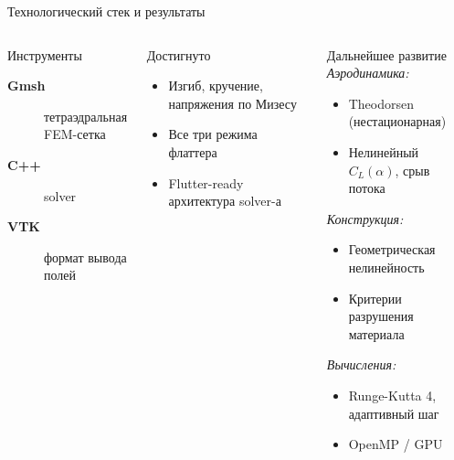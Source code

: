 \documentclass[9pt,aspectratio=169]{beamer}
\begin{document}
\begin{frame}{Технологический стек и результаты}
  \begin{columns}[T]
      \begin{block}{Инструменты}
        \begin{description}
          \item[\textbf{Gmsh}]     тетраэдральная FEM-сетка
          \item[\textbf{C++}]      solver
          \item[\textbf{VTK}]      формат вывода полей
        \end{description}
      \end{block}

      \medskip

      \begin{block}{Достигнуто}
        \begin{itemize}
          \item Изгиб, кручение, напряжения по Мизесу
          \item Все три режима флаттера
          \item Flutter-ready архитектура solver-а
        \end{itemize}
      \end{block}

      \begin{block}{Дальнейшее развитие}
        \textit{Аэродинамика:}
        \begin{itemize}
          \item Theodorsen (нестационарная)
          \item Нелинейный $C_L(\alpha)$, срыв потока
        \end{itemize}
        \textit{Конструкция:}
        \begin{itemize}
          \item Геометрическая нелинейность
          \item Критерии разрушения материала
        \end{itemize}
        \textit{Вычисления:}
        \begin{itemize}
          \item Runge-Kutta 4, адаптивный шаг
          \item OpenMP / GPU
        \end{itemize}
      \end{block}
  \end{columns}
\end{frame}
\end{document}
